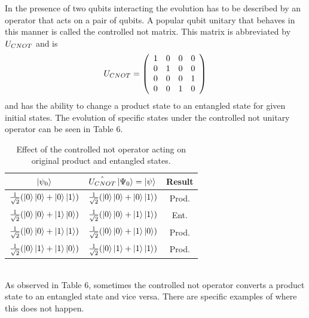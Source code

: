 \documentclass[twocolumn]{article}
\begin{document}
In the presence of two qubits interacting the evolution has to be described by an operator that acts on a pair of qubits. A popular qubit unitary that behaves in this manner is called the controlled not matrix. This matrix is abbreviated by $U_{\tiny{CNOT}}$ and is
\begin{equation} \label{eq:30}
U_{\tiny{CNOT}}=
\left(\begin{array}{cccc}
1 & 0 & 0 & 0 \\
0 & 1 & 0 & 0 \\
0 & 0 & 0 & 1 \\
0 & 0 & 1 & 0 \\
\end{array}\right)
\end{equation}
and has the ability to change a product state to an entangled state for given initial states. The evolution of specific states under the controlled not unitary operator can be seen in Table 6.
\begin{table}[h!]
\begin{center}
\begin{tabular}{ |c|c|c| }
\hline $\ket{\psi_0}$ & $\hat{U_{CNOT}}\ket{\Psi_0}=\ket{\psi}$ & Result \\
\hline $\frac{1}{\sqrt{2}}(\ket{0}\ket{0}+\ket{0}\ket{1})$ & $\frac{1}{\sqrt{2}}(\ket{0}\ket{0}+\ket{0}\ket{1})$ & Prod. \\
\hline $\frac{1}{\sqrt{2}}(\ket{0}\ket{0}+\ket{1}\ket{0})$ & $\frac{1}{\sqrt{2}}(\ket{0}\ket{0}+\ket{1}\ket{1})$ & Ent. \\
\hline $\frac{1}{\sqrt{2}}(\ket{0}\ket{0}+\ket{1}\ket{1})$ & $\frac{1}{\sqrt{2}}(\ket{0}\ket{0}+\ket{1}\ket{0})$ & Prod. \\
\hline $\frac{1}{\sqrt{2}}(\ket{0}\ket{1}+\ket{1}\ket{0})$ & $\frac{1}{\sqrt{2}}(\ket{0}\ket{1}+\ket{1}\ket{1})$ & Prod. \\
\hline 
\end{tabular}
\caption{Effect of the controlled not operator acting on original product and entangled states.}
\end{center}
\end{table} \\
As observed in Table 6, sometimes the controlled not operator converts a product state to an entangled state and vice versa. There are specific examples of where this does not happen.
\end{document}
